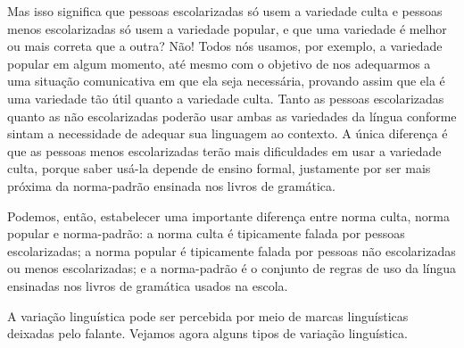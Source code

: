 {Mas isso significa que pessoas escolarizadas só usem a variedade culta e
pessoas menos escolarizadas só usem a variedade popular, e que uma
variedade é melhor ou mais correta que a outra? Não! Todos nós usamos,
por exemplo, a variedade popular em algum momento, até mesmo com o
objetivo de nos adequarmos a uma situação comunicativa em que ela seja
necessária, provando assim que ela é uma variedade tão útil quanto a
variedade culta. Tanto as pessoas escolarizadas quanto as não
escolarizadas poderão usar ambas as variedades da língua conforme sintam
a necessidade de adequar sua linguagem ao contexto. A única diferença é
que as pessoas menos escolarizadas terão mais dificuldades em usar a
variedade culta, porque saber usá-la depende de ensino formal,
justamente por ser mais próxima da norma-padrão ensinada nos livros de
gramática.

Podemos, então, estabelecer uma importante diferença entre norma culta,
norma popular e norma-padrão: a norma culta é tipicamente falada por
pessoas escolarizadas; a norma popular é tipicamente falada por pessoas
não escolarizadas ou menos escolarizadas; e a norma-padrão é o conjunto
de regras de uso da língua ensinadas nos livros de gramática usados na
escola.

A variação linguística pode ser percebida por meio de marcas
linguísticas deixadas pelo falante. Vejamos agora alguns tipos de
variação linguística.}

